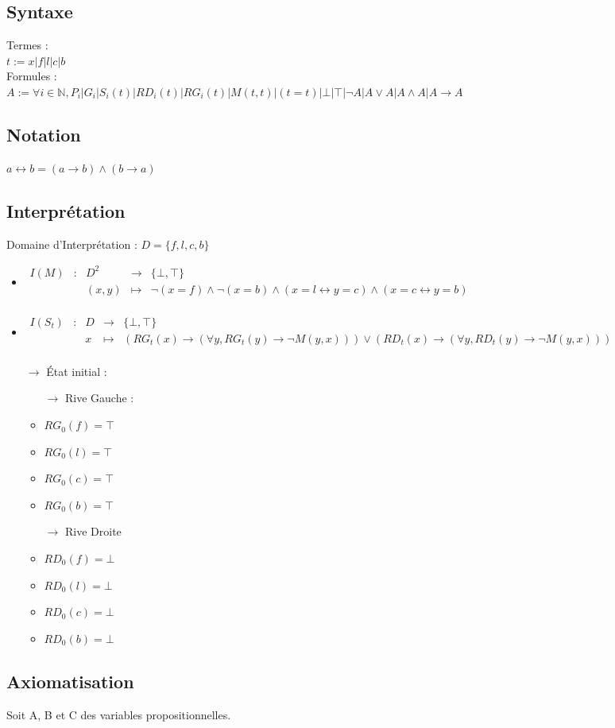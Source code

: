\documentclass{article}
\newcommand{\N}{\mathbb{N}}
\newcommand{\fct}[5]
	{
	  \begin{array}{ccccc}
		#1 & : & #2 & \to & #3 \\
	    && #4 & \mapsto & #5 \\
	  \end{array}
	}
\begin{document}
\subsection{Syntaxe}
Termes : \\
$t := x|f|l|c|b$ \\
Formules : \\
$A := \forall i \in\N, P_i|G_i|S_i(t)|RD_i(t)|RG_i(t)|M(t,t)|(t=t)| \bot|\top|\neg A|A\vee A|A\wedge A|A \rightarrow A$

\subsection{Notation}
$ a \leftrightarrow b = (a \rightarrow b) \wedge  (b \rightarrow a)$
\subsection{Interprétation}
Domaine d'Interprétation : $D = \{f,l,c,b\}$
\begin{itemize}

  \item $\fct{I(M)}{D^2}{\{\bot,\top\}}{(x,y)}{\neg(x=f) \wedge \neg(x=b) \wedge (x=l \leftrightarrow y=c) \wedge (x=c \leftrightarrow y=b)}$
  \item $\fct{I(S_t)}{D}{\{\bot,\top\}}{x}{(RG_t(x) \to (\forall y , RG_t(y) \to \neg M(y,x) )) \vee (RD_t(x) \to (\forall y , RD_t(y) \to \neg M(y,x) ))} $
  \item[$ \to $] État initial :
    \begin{itemize}
      \item[$ \to $] Rive Gauche :
      \item $ RG_0(f) = \top $
      \item $ RG_0(l) = \top $
      \item $ RG_0(c) = \top $
      \item $ RG_0(b) = \top $
      \item[$ \to $] Rive Droite
      \item $ RD_0(f) = \bot $
      \item $ RD_0(l) = \bot $
      \item $ RD_0(c) = \bot $
      \item $ RD_0(b) = \bot $
    \end{itemize}

\end{itemize}


\subsection{Axiomatisation}
Soit A, B et C des variables propositionnelles.
\end{document}
